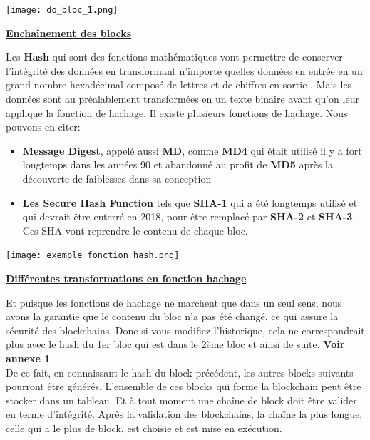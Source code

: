 \documentclass[12pt]{report}
\begin{document}
\begin{center}
    \texttt{[image: do\_bloc\_1.png]}

    \textbf{\underline{Enchaînement des blocks}} \\[1cm]
\end{center}

\hspace{1cm} Les \textbf{Hash} qui sont des fonctions mathématiques vont permettre de conserver l'intégrité des données en transformant n'importe quelles données en entrée en un grand nombre hexadécimal composé de lettres et de chiffres en sortie . Mais les données sont au préalablement transformées en un texte binaire avant qu'on leur applique la fonction de hachage. Il existe plusieurs fonctions de hachage. Nous pouvons en citer:
\begin{itemize}
    \item \textbf{Message Digest}, appelé aussi \textbf{MD}, comme \textbf{MD4} qui  était utilisé il y a fort longtemps dans les années 90 et abandonné au profit de \textbf{MD5} après la découverte de faiblesses dans sa conception
    \item \textbf{Les Secure Hash Function} tels que \textbf{SHA-1} qui a été longtemps utilisé et qui devrait être enterré en 2018, pour être remplacé par \textbf{SHA-2} et \textbf{SHA-3}. Ces SHA vont reprendre le contenu de chaque bloc.
\end{itemize}

\begin{center}
    \texttt{[image: exemple\_fonction\_hash.png]}

    \textbf{\underline{Différentes transformations en fonction hachage}} \\[1cm]
\end{center}

Et puisque les fonctions de hachage  ne marchent que dans un seul sens, nous avons la garantie que le contenu du bloc n'a pas été changé, ce qui assure la sécurité des blockchains. Donc si vous modifiez l'historique, cela ne correspondrait plus avec le hash du 1er bloc qui est dans le 2ème bloc et ainsi de suite. \textbf{Voir annexe 1}\\

\hspace{1cm} De ce fait, en connaissant le hash du block précédent, les autres blocks suivants pourront être générés. L'ensemble de ces blocks qui forme la blockchain peut être stocker dans un tableau. Et à tout moment une chaîne de block doit être valider en terme d'intégrité. Après la validation des blockchains, la chaîne la plus longue, celle qui a le plus de block, est choisie et est mise en exécution.\\
\end{document}
